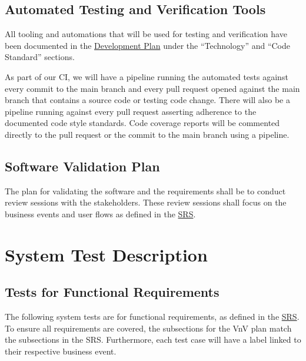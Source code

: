 \documentclass[12pt, titlepage]{article}
\begin{document}
\subsection{Automated Testing and Verification Tools} \label{Automated Testing and Verification Tools}

All tooling and automations that will be used for testing and verification have been documented in
the
\href{https://github.com/arkinmodi/project-sayyara/blob/main/docs/DevelopmentPlan/DevelopmentPlan.pdf}{Development
	Plan} under the ``Technology'' and ``Code Standard'' sections.

As part of our CI, we will have a pipeline running the automated tests against every commit to the
main branch and every pull request opened against the main branch that contains a source code or
testing code change. There will also be a pipeline running against every pull request asserting
adherence to the documented code style standards. Code coverage reports will be commented directly
to the pull request or the commit to the main branch using a pipeline.

\subsection{Software Validation Plan}

The plan for validating the software and the requirements shall be to conduct review sessions with
the stakeholders. These review sessions shall focus on the business events and user flows as
defined in the \href{https://github.com/arkinmodi/project-sayyara/blob/main/docs/SRS/SRS.pdf}{SRS}.

\section{System Test Description} \label{System Test Description}

\subsection{Tests for Functional Requirements} \label{Tests for Functional Requirements}

The following system tests are for functional requirements, as defined in the
\href{https://github.com/arkinmodi/project-sayyara/blob/main/docs/SRS/SRS.pdf}{SRS}. To ensure all
requirements are covered, the subsections for the VnV plan match the subsections in the SRS.
Furthermore, each test case will have a label linked to their respective business event.
\end{document}
